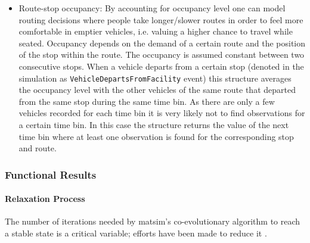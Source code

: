 \begin{itemize}
%
\item Route-stop occupancy: By accounting for occupancy level one can model routing decisions where people take longer/slower routes in order to feel more comfortable in emptier vehicles, i.e. valuing a higher chance to travel while seated. Occupancy depends on the demand of a certain route and the position of the stop within the route. The occupancy is assumed constant between two consecutive stops. When a vehicle departs from a certain stop (denoted in the simulation as \lstinline|VehicleDepartsFromFacility| event) this structure averages the occupancy level with the other vehicles of the same route that departed from the same stop during the same time bin. As there are only a few vehicles  recorded for each time bin it is very likely not to find observations for a certain time bin. In this case the structure returns the value of the next time bin where at least one observation is found for the corresponding stop and route.
\end{itemize}

\subsubsection{Functional Results}
\paragraph{Relaxation Process}

The number of iterations needed by \gls{matsim}'s co-evolutionary algorithm to reach a stable state is a critical variable; efforts have been made to reduce it \citep{MeisterEtAl_STRC_2006, FourieEtAl_TRB_2013}.


